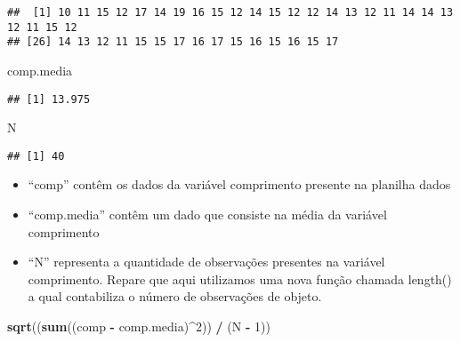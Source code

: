 \documentclass[]{book}
\newenvironment{Shaded}{\begin{snugshade}}{\end{snugshade}}
\newcommand{\DecValTok}[1]{\textcolor[rgb]{0.00,0.00,0.81}{#1}}
\newcommand{\KeywordTok}[1]{\textcolor[rgb]{0.13,0.29,0.53}{\textbf{#1}}}
\newcommand{\NormalTok}[1]{#1}
\newcommand{\OperatorTok}[1]{\textcolor[rgb]{0.81,0.36,0.00}{\textbf{#1}}}
\newcommand{\StringTok}[1]{\textcolor[rgb]{0.31,0.60,0.02}{#1}}
\providecommand{\tightlist}{%
  \setlength{\itemsep}{0pt}\setlength{\parskip}{0pt}}
\begin{document}
\begin{Shaded}
\end{Shaded}

\begin{verbatim}
##  [1] 10 11 15 12 17 14 19 16 15 12 14 15 12 12 14 13 12 11 14 14 13 12 11 15 12
## [26] 14 13 12 11 15 15 17 16 17 15 16 15 16 15 17
\end{verbatim}

\begin{Shaded}
\begin{Highlighting}[]
\NormalTok{comp.media}
\end{Highlighting}
\end{Shaded}

\begin{verbatim}
## [1] 13.975
\end{verbatim}

\begin{Shaded}
\begin{Highlighting}[]
\NormalTok{N}
\end{Highlighting}
\end{Shaded}

\begin{verbatim}
## [1] 40
\end{verbatim}

\begin{itemize}
\tightlist
\item
  ``comp'' contêm os dados da variável comprimento presente na planilha dados
\item
  ``comp.media'' contêm um dado que consiste na média da variável comprimento
\item
  ``N'' representa a quantidade de observações presentes na variável comprimento. Repare que aqui utilizamos uma nova função chamada length() a qual contabiliza o número de observações de objeto.
\end{itemize}

\begin{Shaded}
\begin{Highlighting}[]
\KeywordTok{sqrt}\NormalTok{((}\KeywordTok{sum}\NormalTok{((comp }\OperatorTok{-}\StringTok{ }\NormalTok{comp.media)}\OperatorTok{^}\DecValTok{2}\NormalTok{)) }\OperatorTok{/}\StringTok{ }\NormalTok{(N }\OperatorTok{-}\StringTok{ }\DecValTok{1}\NormalTok{))}
\end{Highlighting}
\end{Shaded}
\end{document}
